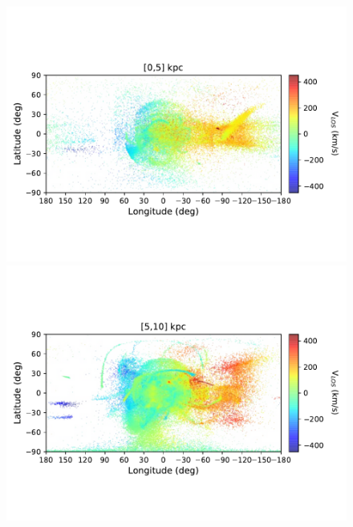 \begin{figure}[h!]
\begin{center}
            \includegraphics[clip=true, trim = 0mm 20mm 0mm 20mm, width=\columnwidth]{images/PII_ensemble_LB_D0-5_RV_new.pdf}
            \includegraphics[clip=true, trim = 0mm 20mm 0mm 20mm, width=\columnwidth]{images/PII_ensemble_LB_D5-10_RV_new.pdf}
        \end{center}

\end{figure}
